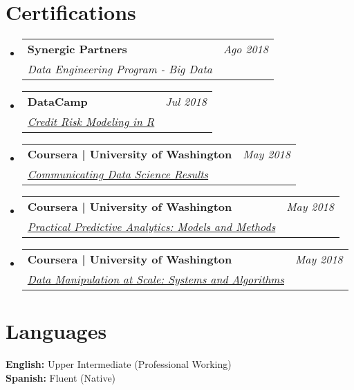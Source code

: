 \documentclass[letterpaper,11pt]{article}
\makeatletter
\newcommand{\resumeCertificationHeading}[4]{
  \vspace{-2pt}\item
    \begin{tabular*}{0.97\textwidth}[t]{l@{\extracolsep{\fill}}r}
      \textbf{#1} & \textit{\small #2} \\
      \textit{\small#3}
    \end{tabular*}\vspace{-7pt}
}
\newcommand{\resumeSubHeadingListStart}{\begin{itemize}[leftmargin=0.15in, label={}]}
\newcommand{\resumeSubHeadingListEnd}{\end{itemize}}
\makeatother
\begin{document}
\section*{Certifications}
    \vspace{3pt}
    \resumeSubHeadingListStart
        \resumeCertificationHeading
        {Synergic Partners}{Ago 2018}{Data Engineering Program - Big Data} \\ \vspace{3pt}
        \resumeCertificationHeading
        {DataCamp}{Jul 2018}{\href{https://www.datacamp.com/statement-of-accomplishment/course/570aea98df0efb32a187e8827252a6e45461ef1f}{Credit Risk Modeling in R}} \\ \vspace{3pt}
        \resumeCertificationHeading
        {Coursera | University of Washington}{May 2018}{\href{https://www.coursera.org/account/accomplishments/verify/Q6FA9BCRNPDD}{Communicating Data Science Results}} \\ \vspace{3pt}
        \resumeCertificationHeading
        {Coursera | University of Washington}{May 2018}{\href{https://www.coursera.org/account/accomplishments/verify/AWPU7U793JRS}{Practical Predictive Analytics: Models and Methods}} \\ \vspace{3pt}
        \resumeCertificationHeading
        {Coursera | University of Washington}{May 2018}{\href{https://www.coursera.org/account/accomplishments/verify/QRZJQH9JU9XW}{Data Manipulation at Scale: Systems and Algorithms}} \\ \vspace{3pt}
    \resumeSubHeadingListEnd

\section*{Languages}
    \vspace{3pt}
    \resumeSubHeadingListStart
        \small{\item{
            \textbf{English:}{ Upper Intermediate (Professional Working)} \\ \vspace{3pt}
            \textbf{Spanish:}{ Fluent (Native)} \\ \vspace{3pt}
        }}
    \resumeSubHeadingListEnd
\end{document}
